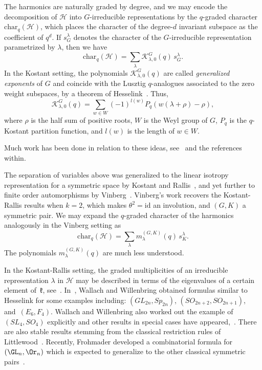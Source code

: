 The harmonics are naturally graded by degree, and we may encode the decomposition of $\mathcal{H}$ into $G$-irreducible representations by the $q$-graded character $\text{char}_q(\mathcal{H})$, which places the character of the degree-$d$ invariant subspace as the coefficient of $q^d$. If $s^\lambda_G$ denotes the character of the $G$-irreducible representation parametrized by $\lambda$, then we have
\begin{equation*}
    \text{char}_q(\mathcal{H}) = \sum_\lambda \mathcal{K}^G_{\lambda,0}(q) \, s^\lambda_G.
\end{equation*}
In the Kostant setting, the polynomials $\mathcal{K}^G_{\lambda,0}(q)$ are called \textit{generalized exponents} of $G$ and coincide with the Lusztig $q$-analogues associated to the zero weight subspaces, by a theorem of Hesselink~\cite{Hesselink1980}. Thus,
\begin{equation*}
    \mathcal{K}_{\lambda,0}^G(q) = \sum_{w \in W} (-1)^{l(w)}P_q(w(\lambda + \rho)-\rho),
\end{equation*}
where $\rho$ is the half sum of positive roots, $W$ is the Weyl group of $G$, $P_q$ is the $q$-Kostant partition function, and $l(w)$ is the length of $w \in W$.

Much work has been done in relation to these ideas, see~\cite{KwonJang2021, LecouveyLenart2020, NelsenRam2003} and the references within.

The separation of variables above was generalized to the linear isotropy representation for a symmetric space by Kostant and Rallis~\cite{KostantRallis1971}, and yet further to finite order automorphisms by Vinberg~\cite{Vinberg1976}. Vinberg's work recovers the Kostant-Rallis results when $k=2$, which makes $\theta^2 = \text{id}$ an involution, and $(G,K)$ a symmetric pair. We may expand the $q$-graded character of the harmonics analogously in the Vinberg setting as
\begin{equation*}
    \text{char}_q(\mathcal{H}) = \sum_\lambda m^{(G,K)}_{\lambda}(q) \, s^\lambda_K.
\end{equation*}
The polynomials $m^{(G,K)}_{\lambda}(q)$ are much less understood. 

In the Kostant-Rallis setting, the graded multiplicities of an irreducible representation $\lambda$ in $\mathcal{H}$ may be described in terms of the eigenvalues of a certain element of~$\mathfrak{k}$, see~\cite[Theorem 21]{KostantRallis1971}. In~\cite{WallachWillenbring2000}, Wallach and Willenbring obtained formulas similar to Hesselink for some examples including: $(GL_{2n}, Sp_{2n})$, $(SO_{2n+2},SO_{2n+1})$, and~$(E_6, F_4)$. Wallach and Willenbring also worked out the example of $(SL_4, SO_4)$ explicitly and other results in special cases have appeared,~\cite{WillenbringVanGroningen2014, JohnsonWallach1977}. There are also stable results stemming from the classical restriction rules of Littlewood~\cite{HoweTanWillenbring2005, HoweTanWillenbring2008, Littlewood1944, Littlewood1945, Willenbring2002}. Recently, Frohmader developed a combinatorial formula for $(\GL_n, \Or_n)$ which is expected to generalize to the other classical symmetric pairs~\cite{frohmader2023graded}. 

